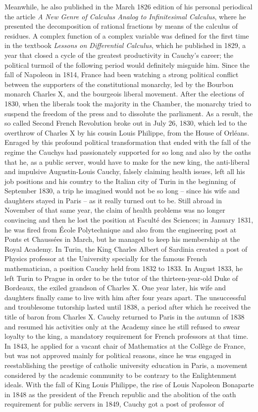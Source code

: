 Meanwhile, he also published in the March 1826 edition of his personal periodical the article \emph{A New Genre of Calculus Analog to Infinitesimal Calculus}, where he presented the decomposition of rational fractions by means of the calculus of residues. A complex function of a complex variable was defined for the first time in the textbook \emph{Lessons on Differential Calculus}, which he published in 1829, a year that closed a cycle of the greatest productivity in Cauchy's career; the political turmoil of the following period would definitely misguide him. Since the fall of Napoleon in 1814, France had been watching a strong political conflict between the supporters of the constitutional monarchy, led by the Bourbon monarch Charles X, and the bourgeois liberal movement. After the elections of 1830, when the liberals took the majority in the Chamber, the monarchy tried to suspend the freedom of the press and to dissolute the parliament. As a result, the so called Second French Revolution broke out in July 26, 1830, which led to the overthrow of Charles X by his cousin Louis Philippe, from the House of Orl\'eans. Enraged by this profound political transformation that ended with the fall of the regime the Cauchys had passionately supported for so long and also by the oaths that he, as a public server, would have to make for the new king, the anti-liberal and impulsive Augustin-Louis Cauchy, falsely claiming health issues, left all his job positions and his country to the Italian city of Turin in the beginning of September 1830, a trip he imagined would not be so long -- since his wife and daughters stayed in Paris -- as it really turned out to be. Still abroad in November of that same year, the claim of health problems was no longer convincing and then he lost the position at Facult\'e des Sciences; in January 1831, he was fired from \'Ecole Polytechnique and also from the engineering post at Ponts et Chauss\'ees in March, but he managed to keep his membership at the Royal Academy. In Turin, the King Charles Albert of Sardinia created a post of Physics professor at the University specially for the famous French mathematician, a position Cauchy held from 1832 to 1833. In August 1833, he left Turin to Prague in order to be the tutor of the thirteen-year-old Duke of Bordeaux, the exiled grandson of Charles X. One year later, his  wife and daughters finally came to live with him after four years apart. The unsuccessful and troublesome tutorship lasted until 1838, a period after which he received the title of baron from Charles X. Cauchy returned to Paris in the autumn of 1838 and resumed his activities only at the Academy since he still refused to swear loyalty to the king, a mandatory requirement for French professors at that time. In 1843, he applied for a vacant chair of Mathematics at the Coll\`ege de France, but was not approved mainly for political reasons, since he was engaged in reestablishing the prestige of catholic university education in Paris, a movement considered by the academic community to be contrary to the Enlightenment ideals. With the fall of King Louis Philippe, the rise of Louis Napoleon Bonaparte in 1848 as the president of the French republic and the abolition of the oath requirement for public servers in 1849, Cauchy got a post of professor of 